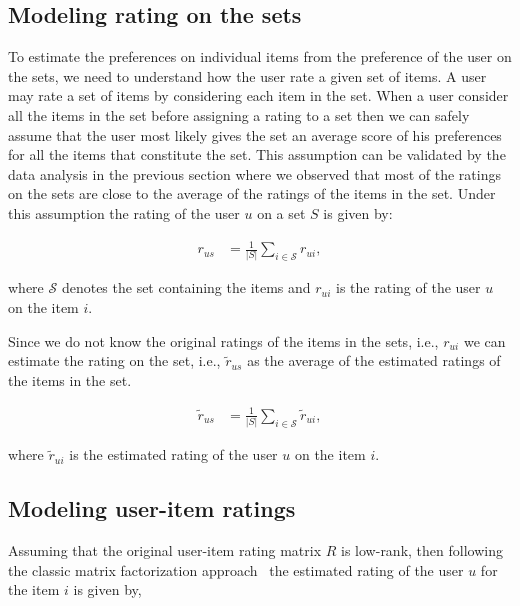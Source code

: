 
\subsection{Modeling rating on the sets}

To estimate the preferences on individual items from the preference of the user on the
sets, we need to understand how the user rate a given set of items. A user may
rate a set of items by considering each item in the set. When a user consider all the 
items in the set before 
assigning a rating to a set then we can safely assume that the user most likely
gives the set an average score of his preferences for all the items that constitute 
the set. This assumption can be validated by the data analysis in the previous
section where we observed that most of the ratings on the sets are close to the
average of the ratings of the items in the set. Under this assumption the  
rating of the user $u$ on a set $S$ is given by: 

\begin{equation} \label{avgSetEq}
  \begin{split}
    r_{us} &= \frac{1}{|S|} \sum_{i \in \mathcal{S}} r_{ui},
  \end{split}
\end{equation}

\noindent where $\mathcal{S}$ denotes the set containing the items and $r_{ui}$ is the
rating of the user $u$ on the item $i$.


Since we do not know the original ratings of the items in the sets, i.e., $r_{ui}$
we can estimate the rating on the set, i.e., $\tilde{r}_{us}$ as the average of the estimated ratings of
the items in the set.

\begin{equation} \label{avgSetEstEq}
  \begin{split}
    \tilde{r}_{us} &= \frac{1}{|S|} \sum_{i \in \mathcal{S}} \tilde{r}_{ui},
  \end{split}
\end{equation}

\noindent where $\tilde{r}_{ui}$ is the estimated rating of the user $u$ on the
item $i$.


\subsection{Modeling user-item ratings}

Assuming that the original user-item rating matrix $R$ is low-rank, then
following the classic matrix factorization approach~\cite{r43} the estimated
rating of the user $u$ for the item $i$ is given by,

